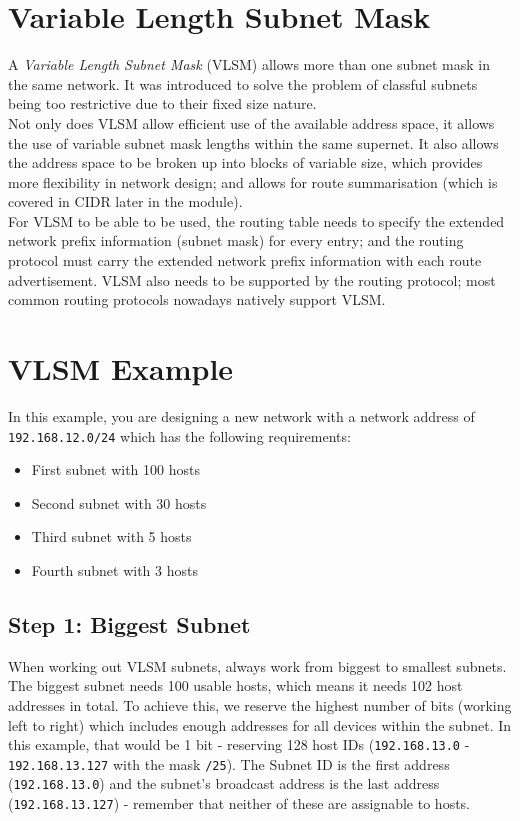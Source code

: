 
\section{Variable Length Subnet Mask}
A \textit{Variable Length Subnet Mask} (VLSM) allows more than one subnet mask in the same network. It was introduced to solve the problem of classful subnets being too restrictive due to their fixed size nature.\\

Not only does VLSM allow efficient use of the available address space, it allows the use of variable subnet mask lengths within the same supernet. It also allows the address space to be broken up into blocks of variable size, which provides more flexibility in network design; and allows for route summarisation (which is covered in CIDR later in the module).\\

For VLSM to be able to be used, the routing table needs to specify the extended network prefix information (subnet mask) for every entry; and the routing protocol must carry the extended network prefix information with each route advertisement. VLSM also needs to be supported by the routing protocol; most common routing protocols nowadays natively support VLSM. 

\section{VLSM Example}
In this example, you are designing a new network with a network address of \verb|192.168.12.0/24| which has the following requirements:
\begin{itemize}
    \item First subnet with 100 hosts
    \item Second subnet with 30 hosts
    \item Third subnet with 5 hosts
    \item Fourth subnet with 3 hosts
\end{itemize}

\subsection{Step 1: Biggest Subnet}
When working out VLSM subnets, always work from biggest to smallest subnets.\\

The biggest subnet needs 100 usable hosts, which means it needs 102 host addresses in total. To achieve this, we reserve the highest number of bits (working left to right) which includes enough addresses for all devices within the subnet. In this example, that would be 1 bit - reserving 128 host IDs (\verb|192.168.13.0| - \verb|192.168.13.127| with the mask \verb|/25|). The Subnet ID is the first address (\verb|192.168.13.0|) and the subnet's broadcast address is the last address (\verb|192.168.13.127|) - remember that neither of these are assignable to hosts.\\

